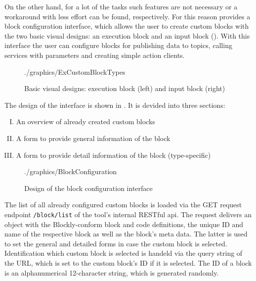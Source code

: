 On the other hand, for a lot of the tasks such features are not necessary or a workaround with less effort can be found, respectively. For this reason \toolname{} provides a block configuration interface, which allows the user to create custom blocks with the two basic visual designs: an execution block and an input block (). With this interface the user can configure blocks for publishing data to topics, calling services with parameters and creating simple action clients.

\begin{figure}[htbp]
	\centering
	\begin{overpic}[width=0.4\linewidth]{./graphics/ExCustomBlockTypes}
	\end{overpic}
	\caption{Basic visual designs: execution block (left) and input block (right)}%
	\label{fig:CustomBlockTypes}%
\end{figure}

The design of the interface is shown in . It is devided into three sections:
\begin{enumerate}[I.]
	\item An overview of already created custom blocks
	\item A form to provide general information of the block
	\item A form to provide detail information of the block (type-specific)
\end{enumerate}

\begin{figure}[htbp]
	\centering
	\begin{overpic}[width=0.8\linewidth]{./graphics/BlockConfiguration}
	\end{overpic}
	\caption{Design of the block configuration interface}%
	\label{fig:BlockConfiguration}%
\end{figure}

The list of all already configured custom blocks is loaded via the GET request endpoint \lstinline!/block/list! of the tool's internal RESTful \gls{api}. The request delivers an object with the Blockly-conform block and code definitions, the unique ID and name of the respective block as well as the block's meta data. The latter is used to set the general and detailed forms in case the custom block is selected. Identification which custom block is selected is handeld via the query string of the URL, which is set to the custom block's ID if it is selected. The ID of a block is an alphanumerical 12-character string, which is generated randomly. \\

